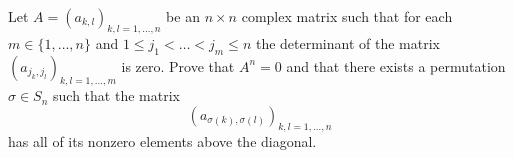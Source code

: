 \documentclass{article}
\begin{document}
\setlength{\parindent}{0pt}
Let $A=(a_{k,l})_{k,l=1,\dots,n}$ be an $n\times n$ complex matrix such that for each $m\in\{1,\dots,n\}$ and $1\le j_{1}<\dots<j_{m}\le n$ the determinant of the matrix $(a_{j_{k},j_{l}})_{k,l=1,\dots,m}$ is zero. Prove that $A^{n}=0$ and that there exists a permutation $\sigma\in S_{n}$ such that the matrix$$\left(a_{\sigma(k),\sigma(l)}\right)_{k,l=1,\dots,n}$$has all of its nonzero elements above the diagonal.
\end{document}
